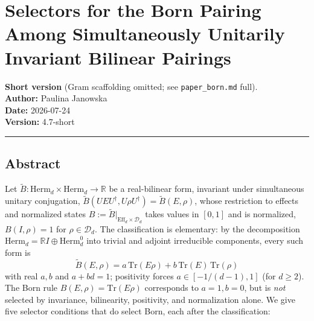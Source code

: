 \documentclass[
]{article}
\author{}
\date{}
\begin{document}
\section{Selectors for the Born Pairing Among Simultaneously Unitarily
Invariant Bilinear
Pairings}\label{selectors-for-the-born-pairing-among-simultaneously-unitarily-invariant-bilinear-pairings}

\textbf{Short version} (Gram scaffolding omitted; see
\texttt{paper\_born.md} full).\\
\textbf{Author:} Paulina Janowska\\
\textbf{Date:} 2026-07-24\\
\textbf{Version:} 4.7-short

\begin{center}\rule{0.5\linewidth}{0.5pt}\end{center}

\subsection{Abstract}\label{abstract}

Let \(\widetilde B:\mathrm{Herm}_d\times\mathrm{Herm}_d\to\mathbb R\) be
a real-bilinear form, invariant under simultaneous unitary conjugation,
\(\widetilde B(UEU^\dagger,U\rho U^\dagger)=\widetilde B(E,\rho)\),
whose restriction to effects and normalized states
\(B:=\widetilde B|_{\mathrm{Eff}_d\times\mathcal D_d}\) takes values in
\([0,1]\) and is normalized, \(B(I,\rho)=1\) for
\(\rho\in\mathcal D_d\). The classification is elementary: by the
decomposition \(\mathrm{Herm}_d=\mathbb RI\oplus\mathrm{Herm}_d^0\) into
trivial and adjoint irreducible components, every such form is
\[\widetilde B(E,\rho)=a\,\mathrm{Tr}(E\rho)+b\,\mathrm{Tr}(E)\,\mathrm{Tr}(\rho)\]
with real \(a,b\) and \(a+bd=1\); positivity forces \(a\in[-1/(d-1),1]\)
(for \(d\geq 2\)). The Born rule \(B(E,\rho)=\mathrm{Tr}(E\rho)\)
corresponds to \(a=1,b=0\), but is \emph{not} selected by invariance,
bilinearity, positivity, and normalization alone. We give five selector
conditions that do select Born, each after the classification:
\end{document}
